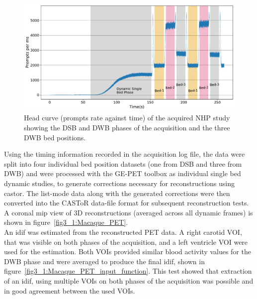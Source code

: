 \begin{figure} [ht!]
\centering
\includegraphics[scale=0.45,angle=0]{3_Results/3_1_DWB_Optimization/figures/3_1_Macaque_Head_curve_Phases.pdf}
\caption{Head curve (prompts rate against time) of the acquired NHP study showing the DSB and DWB phases of the acquisition and the three DWB bed positions.}
\label{fig3_1:Macaque_Head_Curve_Phases}
\end{figure}
%
Using the timing information recorded in the acquisition log file, the data were split into four individual bed position datasets (one from DSB and three from DWB) and were processed with the GE-PET toolbox as individual single bed dynamic studies, to generate corrections necessary for reconstructions using \gls{castor}. The list-mode data along with the generated corrections were then converted into the CASToR data-file format for subsequent reconstruction tests. A coronal \gls{mip} view of 3D reconstructions (averaged across all dynamic frames) is shown in figure~\ref{fig3_1:Macaque_PET}. \\
An \gls{idif} was estimated from the reconstructed PET data. A right carotid VOI, that was visible on both phases of the acquisition, and a left ventricle VOI were used for the estimation. Both VOIs provided similar blood activity values for the DWB phase and were averaged to produce the final \gls{idif}, shown in figure~\ref{fig3_1:Macaque_PET_input_function}. This test showed that extraction of an \gls{idif}, using multiple VOIs on both phases of the acquisition was possible and in good agreement between the used VOIs.
%
